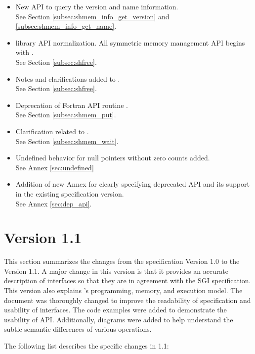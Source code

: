 \begin{itemize}
%
\item New API to query the version and name information. 
\\See Section \ref{subsec:shmem_info_get_version} and \ref{subsec:shmem_info_get_name}.
%
\item \openshmem library API normalization. All \Cstd symmetric memory management
      API begins with  .
\\See Section \ref{subsec:shfree}.
%
\item Notes and clarifications added to .
\\See Section \ref{subsec:shfree}.
%
\item Deprecation of Fortran API routine .
\\See Section \ref{subsec:shmem_put}. 
%
\item Clarification related to .
\\See Section \ref{subsec:shmem_wait}.
%
\item Undefined behavior for null pointers without zero counts added.
\\See Annex \ref{sec:undefined}
%
\item Addition of new Annex for clearly specifying deprecated API and its
      support in the existing specification version.
\\See Annex \ref{sec:dep_api}.
%
\end{itemize}




\section{Version 1.1}
This section summarizes the changes from the \openshmem specification Version
1.0 to the Version 1.1.  A major change in this version is that it provides an
accurate description of \openshmem interfaces so that they are in agreement with
the SGI specification.  This version also explains \openshmem's programming,
memory, and execution model.  The document was thoroughly changed to improve the
readability of specification and usability of interfaces.  The code examples
were added to demonstrate the usability of API. Additionally, diagrams were
added to help understand the subtle semantic differences of various operations.


The following list describes the specific changes in 1.1:

